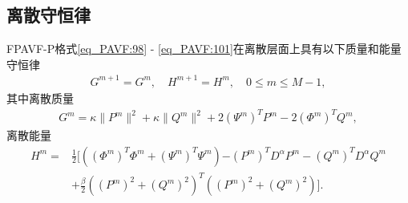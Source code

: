 \subsection{离散守恒律}
\begin{theorem}\label{thm_PAVF:4}
FPAVF-P格式\eqref{eq_PAVF:98} - \eqref{eq_PAVF:101}在离散层面上具有以下质量和能量守恒律
\begin{align}\label{eq_PAVF:11141}
G^{m+1}=G^{m} , \quad H^{m+1}=H^{m} , \quad 0 \leq m \leq M-1 , 
\end{align}
其中离散质量
\begin{align}\label{eq_PAVF:11142}
G^{m}=\kappa\|P^{m}\|^2+\kappa\|Q^{m}\|^2+2 \left(\Psi^{m}\right)^T P^{m}-2 \left(\varPhi^{m}\right)^T Q^{m} , 
\end{align}
离散能量
\begin{align}
H^{m}=&\frac{1}{2}[((\varPhi^{m})^{T}\varPhi^{m}+(\Psi^{m})^{T}\Psi^{m}){-(P^{m})^{T} D^{\alpha} P^{m}-(Q^{m})^{T} D^{\alpha} Q^{m}}\nonumber\\
&+\frac{\beta}{2}((P^{m})^2+(Q^{m})^2)^{T}((P^{m})^2+(Q^{m})^2)] . \label{eq_PAVF:800}
\end{align}
\end{theorem}

